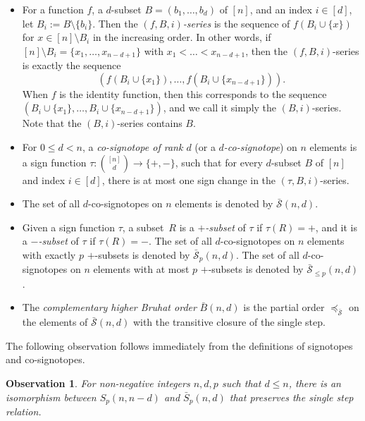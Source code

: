 \documentclass[a4paper,11pt]{amsart}
\newtheorem{observation}[theorem]{Observation}
\newcommand{\binnd}{\binom{[n]}{d}}
\newcommand{\calS}{\mathcal{S}}
\newcommand{\defi}[1]{\textcolor{defblue}{\emph{#1}}}
\begin{document}
\begin{itemize}
    \item For a function $f$, a $d$-subset $B = (b_1, \dots, b_d)$ of $[n]$, and an index $i \in [d]$, let $B_i := B \setminus \{b_i\}$.
    Then the \defi{$(f,B,i)$-series} is the sequence of $f(B_i \cup \{x\})$ for $x \in [n] \setminus B_i$ in the increasing order.
    In other words, if $[n] \setminus B_i = \{x_1, \dots, x_{n-d+1}\}$ with $x_1 < \dots < x_{n-d+1}$, then the $(f,B,i)$-series is exactly the sequence
    \[
        (f(B_i\cup\{x_1\}), \dots, f(B_i\cup\{x_{n-d+1}\})).
    \]
    When $f$ is the identity function, then this corresponds to the sequence $(B_i\cup\{x_1\}, \dots, B_i\cup\{x_{n-d+1}\})$, and we call it simply the $(B,i)$-series.
    Note that the $(B,i)$-series contains $B$.

    \item For $0\leq d < n$, a \defi{co-signotope of rank $d$} (or a \defi{$d$-co-signotope}) on $n$ elements is a sign function $\tau: \binnd \to \{+,-\}$, such that for every $d$-subset $B$ of $[n]$ and index $i \in [d]$, there is at most one sign change in the $(\tau,B,i)$-series.
    \item The set of all $d$-co-signotopes on $n$ elements is denoted by $\bar{\calS}(n,d)$.
    \item Given a sign function $\tau$, a subset~$R$ is a \defi{$+$-subset} of $\tau$ if $\tau(R)=+$, and it is a \defi{$-$-subset} of $\tau$ if $\tau(R)=-$.
    The set of all $d$-co-signotopes on $n$ elements with exactly $p$ $+$-subsets is denoted by $\bar{\calS}_{p}(n,d)$. 
    The set of all $d$-co-signotopes on $n$ elements with at most $p$ $+$-subsets is denoted by $\bar{\calS}_{\leq p}(n,d)$. 
    
    \item The \defi{complementary higher Bruhat order} $\bar{B}(n,d)$ is the partial order $\preceq_{\bar{\calS}}$ on the elements of $\bar{\calS}(n,d)$ with the transitive closure of the single step.
\end{itemize}

The following observation follows immediately from the definitions of signotopes and co-signotopes.

\begin{observation}
    For non-negative integers $n, d, p$ such that $d \leq n$, there is an isomorphism between $S_p(n,n-d)$ and $\bar{S}_p(n,d)$ that preserves the single step relation.
\end{observation}
\end{document}
